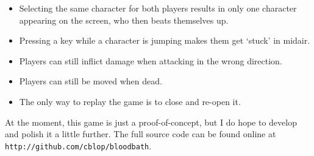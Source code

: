 \documentclass[11pt]{article}
\begin{document}
\begin{itemize}[noitemsep]
    \item Selecting the same character for both players results in only one character appearing on the screen, who then beats themselves up.
    \item Pressing a key while a character is jumping makes them get `stuck' in midair.
    \item Players can still inflict damage when attacking in the wrong direction.
    \item Players can still be moved when dead.
    \item The only way to replay the game is to close and re-open it.
\end{itemize}

At the moment, this game is just a proof-of-concept, but I do hope to develop and polish it a little further. The full source code can be found online at \texttt{http://github.com/cblop/bloodbath}.



\end{document}
